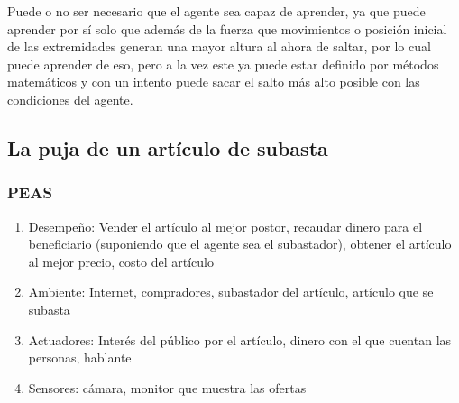 \documentclass{article}
\begin{document}
                Puede o no ser necesario que el agente sea capaz de aprender, ya que puede aprender por sí solo que además de la fuerza que movimientos o posición inicial de las extremidades generan una mayor altura al ahora de saltar, por lo cual puede aprender de eso, pero a la vez este ya puede estar definido por métodos matemáticos y con un intento puede sacar el salto más alto posible con las condiciones del agente.

        \subsection{La puja de un artículo de subasta}
            \subsubsection{PEAS}
                \begin{enumerate}
                    \item Desempeño: Vender el artículo al mejor postor, recaudar dinero para el beneficiario (suponiendo que el agente sea el subastador), obtener el artículo al mejor precio, costo del artículo
                    \item Ambiente: Internet, compradores, subastador del artículo, artículo que se subasta
                    \item Actuadores: Interés del público por el artículo, dinero con el que cuentan las personas, hablante
                    \item Sensores: cámara, monitor que muestra las ofertas
                \end{enumerate}
            
\end{document}
